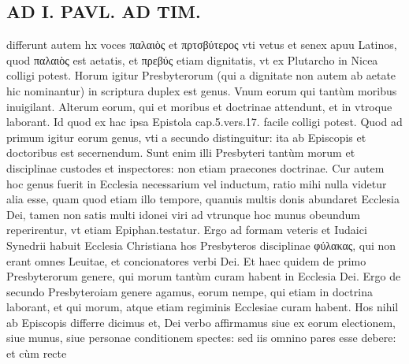 \documentclass{article}
\begin{document}
\begin{pages}
\section*{AD I. PAVL. AD TIM. }
\marginpar{[ p.94 ]}\pstart differunt autem hx voces παλαιὸς et πρτσβύτερος vti vetus et senex apuu Latinos, quod παλαιὸς est aetatis, et πρεβύς etiam dignitatis, vt ex Plutarcho in Nicea colligi potest. Horum igitur Presbyterorum (qui a dignitate non autem ab aetate hic nominantur) in scriptura duplex est genus. Vnum eorum qui tantùm moribus inuigilant. Alterum eorum, qui et moribus et doctrinae attendunt, et in vtroque laborant. Id quod ex hac ipsa Epistola cap.5.vers.17. facile colligi potest. Quod ad primum igitur eorum genus, vti a secundo distinguitur: ita ab Episcopis et doctoribus est secernendum. Sunt enim illi Presbyteri tantùm morum et disciplinae custodes et inspectores: non etiam praecones doctrinae. Cur autem hoc genus fuerit in Ecclesia necessarium vel inductum, ratio mihi nulla videtur alia esse, quam quod etiam illo tempore, quanuis multis donis abundaret Ecclesia Dei, tamen non satis multi idonei viri ad vtrunque hoc munus obeundum reperirentur, vt etiam Epiphan.testatur. Ergo ad formam veteris et Iudaici Synedrii habuit Ecclesia Christiana hos Presbyteros disciplinae φύλακας, qui non erant omnes Leuitae, et concionatores verbi Dei. Et haec quidem de primo Presbyterorum genere, qui morum tantùm curam habent in Ecclesia Dei. Ergo de secundo Presbyteroiam genere agamus, eorum nempe, qui etiam in doctrina laborant, et qui morum, atque etiam regiminis Ecclesiae curam habent. Hos nihil ab Episcopis differre dicimus et, Dei verbo affirmamus siue ex eorum electionem, siue munus, siue personae conditionem spectes: sed iis omnino pares esse debere: et cùm recte  \pend

\end{pages}
\end{document}
